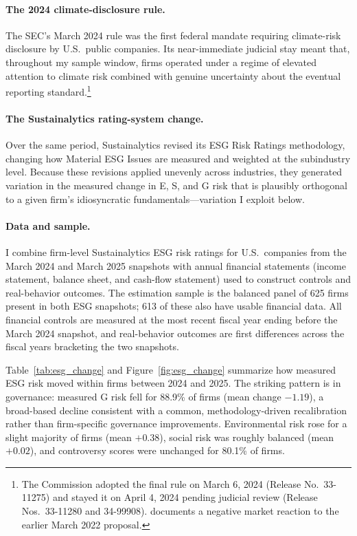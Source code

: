 \documentclass[12pt]{article}
\begin{document}
\paragraph{The 2024 climate-disclosure rule.} The SEC's March 2024 rule was the first
federal mandate requiring climate-risk disclosure by U.S.\ public companies. Its near-immediate
judicial stay meant that, throughout my sample window, firms operated under a regime of elevated
attention to climate risk combined with genuine uncertainty about the eventual reporting
standard.\footnote{The Commission adopted the final rule on March 6, 2024 (Release No.\ 33-11275)
and stayed it on April 4, 2024 pending judicial review (Release Nos.\ 33-11280 and 34-99908).
\citet{Kim2024_sec_climate_reaction}
documents a negative market reaction to the earlier March 2022 proposal.}

\paragraph{The Sustainalytics rating-system change.} Over the same period, Sustainalytics
revised its ESG Risk Ratings methodology, changing how Material ESG Issues are measured and
weighted at the subindustry level. Because these revisions applied unevenly across industries,
they generated variation in the measured change in E, S, and G risk that is plausibly orthogonal
to a given firm's idiosyncratic fundamentals---variation I exploit below.

\paragraph{Data and sample.} I combine firm-level Sustainalytics ESG risk ratings for U.S.\
companies from the March 2024 and March 2025 snapshots with annual financial statements
(income statement, balance sheet, and cash-flow statement) used to construct controls and real-behavior
outcomes. The estimation sample is the balanced panel of 625 firms present in both ESG snapshots;
613 of these also have usable financial data. All financial controls are measured at the most
recent fiscal year ending before the March 2024 snapshot, and real-behavior outcomes are first
differences across the fiscal years bracketing the two snapshots.

Table~\ref{tab:esg_change} and Figure~\ref{fig:esg_change} summarize how measured ESG risk moved
within firms between 2024 and 2025. The striking pattern is in governance: measured G risk fell
for 88.9\% of firms (mean change $-1.19$), a broad-based decline consistent with a common,
methodology-driven recalibration rather than firm-specific governance improvements. Environmental
risk rose for a slight majority of firms (mean $+0.38$), social risk was roughly balanced (mean
$+0.02$), and controversy scores were unchanged for 80.1\% of firms.
\end{document}
